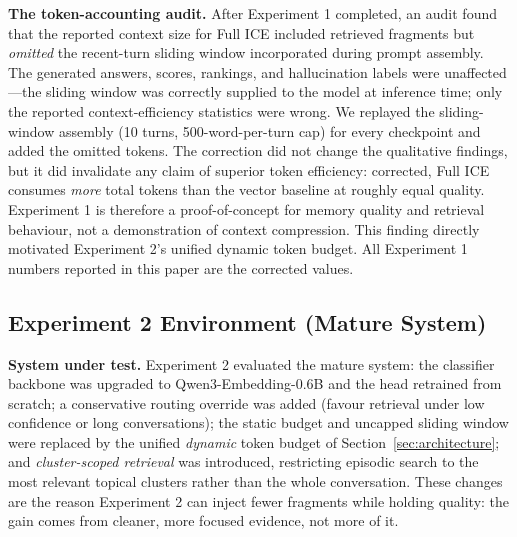 \documentclass[11pt,a4paper]{article}
\begin{document}
\textbf{The token-accounting audit.} After Experiment 1 completed, an audit found that the reported context size for Full ICE included retrieved fragments but \emph{omitted} the recent-turn sliding window incorporated during prompt assembly. The generated answers, scores, rankings, and hallucination labels were unaffected---the sliding window was correctly supplied to the model at inference time; only the reported context-efficiency statistics were wrong. We replayed the sliding-window assembly (10 turns, 500-word-per-turn cap) for every checkpoint and added the omitted tokens. The correction did not change the qualitative findings, but it did invalidate any claim of superior token efficiency: corrected, Full ICE consumes \emph{more} total tokens than the vector baseline at roughly equal quality. Experiment 1 is therefore a proof-of-concept for memory quality and retrieval behaviour, not a demonstration of context compression. This finding directly motivated Experiment 2's unified dynamic token budget. All Experiment 1 numbers reported in this paper are the corrected values.

\subsection{Experiment 2 Environment (Mature System)}
\label{sec:exp2-env}

\textbf{System under test.} Experiment 2 evaluated the mature system: the classifier backbone was upgraded to Qwen3-Embedding-0.6B and the head retrained from scratch; a conservative routing override was added (favour retrieval under low confidence or long conversations); the static budget and uncapped sliding window were replaced by the unified \emph{dynamic} token budget of Section~\ref{sec:architecture}; and \emph{cluster-scoped retrieval} was introduced, restricting episodic search to the most relevant topical clusters rather than the whole conversation. These changes are the reason Experiment 2 can inject fewer fragments while holding quality: the gain comes from cleaner, more focused evidence, not more of it.
\end{document}
